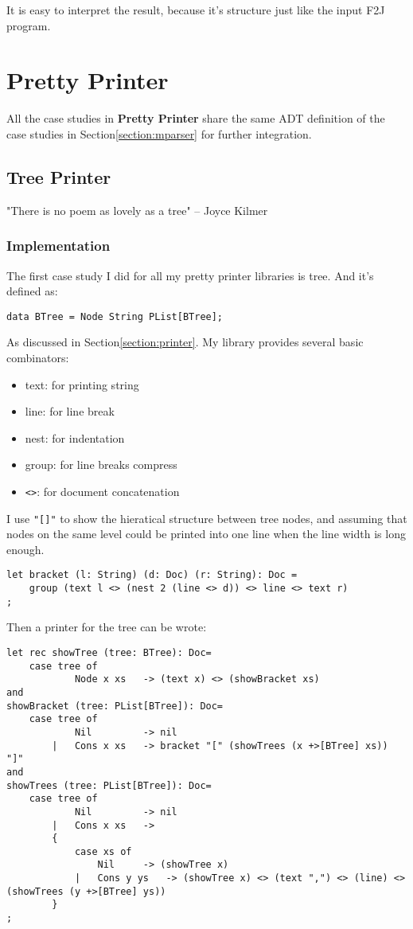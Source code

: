 It is easy to interpret the result, because it's structure just like the input F2J program.

\section{Pretty Printer}

All the case studies in \textbf{Pretty Printer} share the same ADT definition of the case studies in Section\ref{section:mparser} for further integration.

\subsection{Tree Printer}
"There is no poem as lovely as a tree" -- Joyce Kilmer
\subsubsection{Implementation}

The first case study I did for all my pretty printer libraries is tree. And it's defined as:

\begin{lstlisting}
data BTree = Node String PList[BTree];
\end{lstlisting}

As discussed in Section\ref{section:printer}. My library provides several basic combinators:

\begin{itemize}
\item text:    for printing string
\item line:    for line break
\item nest:    for indentation
\item group:   for line breaks compress
\item \texttt{<>}:      for document concatenation
\end{itemize}

I use \texttt{"[]"} to show the hieratical structure between tree nodes, and assuming that nodes on the same level could be printed into one line when the line width is long enough.
\begin{lstlisting}
let bracket (l: String) (d: Doc) (r: String): Doc =
    group (text l <> (nest 2 (line <> d)) <> line <> text r)
;
\end{lstlisting}

Then a printer for the tree can be wrote:

\begin{lstlisting}
let rec showTree (tree: BTree): Doc=
    case tree of
            Node x xs   -> (text x) <> (showBracket xs)
and
showBracket (tree: PList[BTree]): Doc=
    case tree of
            Nil         -> nil
        |   Cons x xs   -> bracket "[" (showTrees (x +>[BTree] xs)) "]"
and
showTrees (tree: PList[BTree]): Doc=
    case tree of
            Nil         -> nil
        |   Cons x xs   ->
        {
            case xs of
                Nil     -> (showTree x)
            |   Cons y ys   -> (showTree x) <> (text ",") <> (line) <> (showTrees (y +>[BTree] ys))
        }
;
\end{lstlisting}

